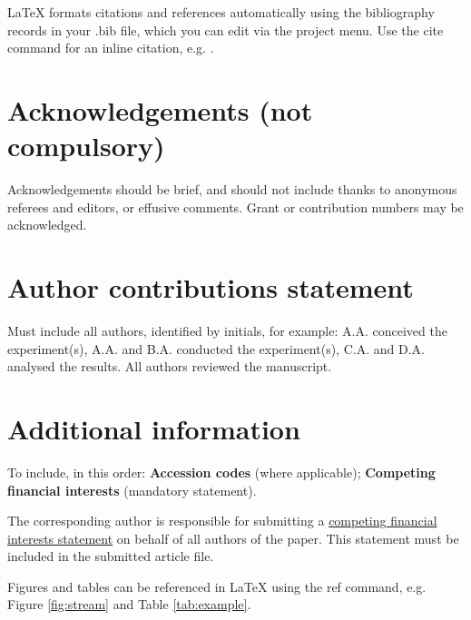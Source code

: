 \documentclass[fleqn,10pt]{wlscirep}\usepackage[]{graphicx}\usepackage[]{color}
\begin{document}


\noindent LaTeX formats citations and references automatically using the bibliography records in your .bib file, which you can edit via the project menu. Use the cite command for an inline citation, e.g.  \cite{Figueredo:2009dg}.

\section*{Acknowledgements (not compulsory)}

Acknowledgements should be brief, and should not include thanks to anonymous referees and editors, or effusive comments. Grant or contribution numbers may be acknowledged.

\section*{Author contributions statement}

Must include all authors, identified by initials, for example:
A.A. conceived the experiment(s),  A.A. and B.A. conducted the experiment(s), C.A. and D.A. analysed the results.  All authors reviewed the manuscript. 

\section*{Additional information}

To include, in this order: \textbf{Accession codes} (where applicable); \textbf{Competing financial interests} (mandatory statement). 

The corresponding author is responsible for submitting a \href{http://www.nature.com/srep/policies/index.html#competing}{competing financial interests statement} on behalf of all authors of the paper. This statement must be included in the submitted article file.




Figures and tables can be referenced in LaTeX using the ref command, e.g. Figure \ref{fig:stream} and Table \ref{tab:example}.
\end{document}
